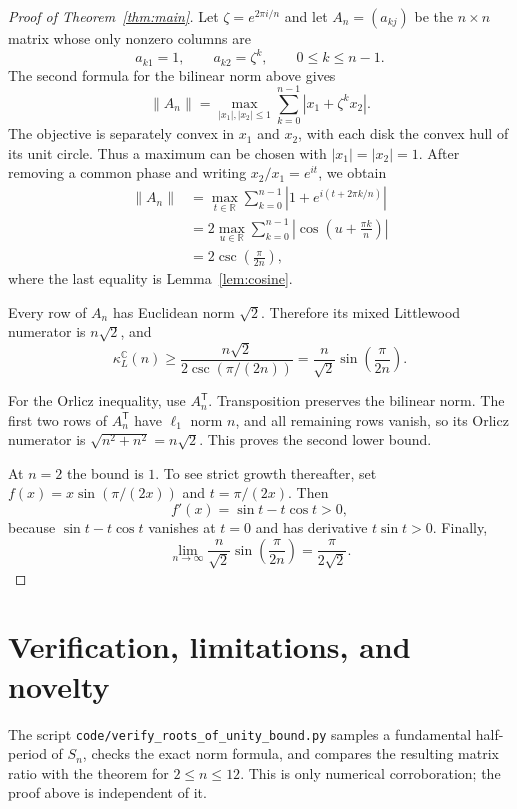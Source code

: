 \documentclass[11pt]{article}
\theoremstyle{remark}
\newcommand{\kL}{\kappa_{L}^{\mathbb C}}
\begin{document}
\begin{proof}[Proof of Theorem~\ref{thm:main}]
Let $\zeta=e^{2\pi i/n}$ and let $A_n=(a_{kj})$ be the $n\times n$ matrix
whose only nonzero columns are
\[
             a_{k1}=1,\qquad a_{k2}=\zeta^k,
             \qquad 0\le k\le n-1.
\]
The second formula for the bilinear norm above gives
\[
 \|A_n\|=\max_{|x_1|,|x_2|\le1}
              \sum_{k=0}^{n-1}|x_1+\zeta^k x_2|.
\]
The objective is separately convex in $x_1$ and $x_2$, with each disk the
convex hull of its unit circle. Thus a maximum can be chosen with
$|x_1|=|x_2|=1$. After removing a common phase and writing
$x_2/x_1=e^{it}$, we obtain
\begin{align*}
 \|A_n\|
   &=\max_{t\in\mathbb R}\sum_{k=0}^{n-1}
          |1+e^{i(t+2\pi k/n)}|\\
   &=2\max_{u\in\mathbb R}\sum_{k=0}^{n-1}
          \left|\cos\!\left(u+\frac{\pi k}{n}\right)\right|\\
   &=2\csc\!\left(\frac{\pi}{2n}\right),
\end{align*}
where the last equality is Lemma~\ref{lem:cosine}.

Every row of $A_n$ has Euclidean norm $\sqrt2$. Therefore its mixed
Littlewood numerator is $n\sqrt2$, and
\[
 \kL(n)\ge\frac{n\sqrt2}{2\csc(\pi/(2n))}
          =\frac{n}{\sqrt2}\sin\!\left(\frac{\pi}{2n}\right).
\]

For the Orlicz inequality, use $A_n^{\mathsf T}$. Transposition preserves the
bilinear norm. The first two rows of $A_n^{\mathsf T}$ have $\ell_1$ norm
$n$, and all remaining rows vanish, so its Orlicz numerator is
$\sqrt{n^2+n^2}=n\sqrt2$. This proves the second lower bound.

At $n=2$ the bound is $1$. To see strict growth thereafter, set
$f(x)=x\sin(\pi/(2x))$ and $t=\pi/(2x)$. Then
\[
 f'(x)=\sin t-t\cos t>0,
\]
because $\sin t-t\cos t$ vanishes at $t=0$ and has derivative
$t\sin t>0$. Finally,
\[
 \lim_{n\to\infty}\frac{n}{\sqrt2}\sin\!\left(\frac{\pi}{2n}\right)
 =\frac{\pi}{2\sqrt2}.
\]
\end{proof}

\section{Verification, limitations, and novelty}

The script \texttt{code/verify\_roots\_of\_unity\_bound.py} samples a
fundamental half-period of $S_n$, checks the exact norm formula, and compares
the resulting matrix ratio with the theorem for $2\le n\le12$. This is only
numerical corroboration; the proof above is independent of it.
\end{document}
